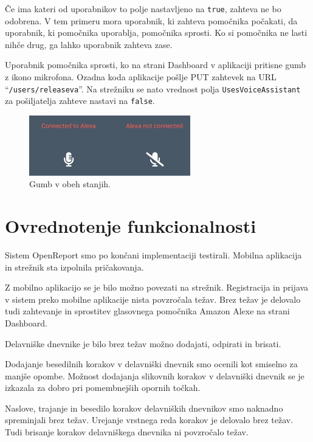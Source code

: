 \documentclass[a4paper, 12pt]{book}
\begin{document}
Če ima kateri od uporabnikov to polje nastavljeno na \texttt{true}, zahteva ne bo odobrena.
V tem primeru mora uporabnik, ki zahteva pomočnika počakati, da uporabnik, ki pomočnika uporablja, pomočnika sprosti.
Ko si pomočnika ne lasti nihče drug, ga lahko uporabnik zahteva zase.

Uporabnik pomočnika sprosti, ko na strani Dashboard v aplikaciji pritisne gumb z ikono mikrofona.
Ozadna koda aplikacije pošlje PUT zahtevek na URL \enquote{\texttt{/users/releaseva}}.
Na strežniku se nato vrednost polja \texttt{UsesVoiceAssistant} za pošiljatelja zahteve nastavi na \texttt{false}.


\begin{figure}[H]
\begin{center}
\includegraphics[width=7cm]{app_alexa_yesno}
\end{center}
	\caption{Gumb v obeh stanjih.}
\label{app_alexa_yesno}
\end{figure}




\chapter{Ovrednotenje funkcionalnosti}

Sistem OpenReport smo po končani implementaciji testirali. 
Mobilna aplikacija in strežnik sta izpolnila pričakovanja.

Z mobilno aplikacijo se je bilo možno povezati na strežnik.
Registracija in prijava v sistem preko mobilne aplikacije nista povzročala težav.
Brez težav je delovalo tudi zahtevanje in sprostitev glasovnega pomočnika Amazon Alexe na strani Dashboard.

Delavniške dnevnike je bilo brez težav možno dodajati, odpirati in brisati.

Dodajanje besedilnih korakov v delavniški dnevnik smo ocenili kot smiselno za manjše opombe.
Možnost dodajanja slikovnih korakov v delavniški dnevnik se je izkazala za dobro pri pomembnejših opornih točkah.

Naslove, trajanje in besedilo korakov delavniških dnevnikov smo naknadno spreminjali brez težav.
Urejanje vrstnega reda korakov je delovalo brez težav.
Tudi brisanje korakov delavniškega dnevnika ni povzročalo težav.
\end{document}
